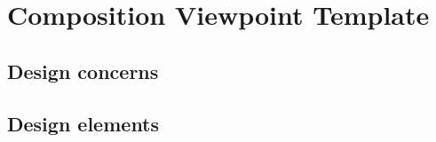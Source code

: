 \chapter{Composition Viewpoint Template} \label{chp:composition-viewpoint-template}
	\begin{comment}
		The Composition viewpoint describes the way the design subject is (recursively) structured into constituent
		parts and establishes the roles of those parts.
	\end{comment}
	
	\section{Design concerns} \label{s:composition-viewpoint-template:design-concerns}
		\begin{comment}
			Software developers and maintainers use this viewpoint to identify the major design constituents of the
			design subject, to localize and allocate functionality, responsibilities, or other design roles to these
			constituents. In maintenance, it can be used to conduct impact analysis and localize the efforts of making
			changes. Reuse, on the level of existing subsystems and large-grained components, can be addressed as
			well. The information in a Composition view can be used by acquisition management and in project
			management for specification and assignment of work packages, and for planning, monitoring, and control
			of a software project. This information, together with other project information, can be used in estimating
			cost, staffing, and schedule for the development effort. Configuration management may use the information
			to establish the organization, tracking, and change management of emerging work products (see
			IEEE Std 12207-2008 [B21]).
		\end{comment}
		
	\section{Design elements} \label{s:composition-viewpoint-template:design-elements}
		\begin{comment}
			Design entities: types of constituents of a system: subsystems, components, modules; ports and (provided
			and required) interfaces; also libraries, frameworks, software repositories, catalogs, and templates.
			
			Design relationships: composition, use, and generalization. The Composition viewpoint supports the
			recording of the part-whole relationships between design entities using realization, dependency,
			aggregation, composition, and generalization relationships. Additional design relationships are required and
			provided (interfaces), and the attachment of ports to components.
			
			Design attributes: For each design entity, the viewpoint provides a reference to a detailed description via
			the identification attribute. The attribute descriptions for identification, type, purpose, function, and
			definition attribute should be utilized.
		\end{comment}	
		
